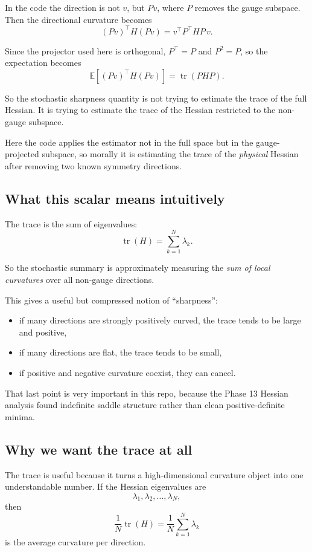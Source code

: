 \documentclass[11pt,letterpaper]{article}
\newcommand{\E}{\mathbb{E}}
\newcommand{\tr}{\operatorname{tr}}
\begin{document}
In the code the direction is not $v$, but $Pv$, where $P$ removes the gauge
subspace. Then the directional curvature becomes
\[
(Pv)^\top H (Pv) = v^\top P^\top H P\, v.
\]

Since the projector used here is orthogonal, $P^\top = P$ and $P^2 = P$, so
the expectation becomes
\[
\E[(Pv)^\top H (Pv)]
=
\tr(P H P).
\]

So the stochastic sharpness quantity is not trying to estimate the trace of the
full Hessian. It is trying to estimate the trace of the Hessian restricted to
the non-gauge subspace.

Here the code applies the estimator not in the full space but in the
gauge-projected subspace, so morally it is estimating the trace of the
\emph{physical} Hessian after removing two known symmetry directions.

\subsection{What this scalar means intuitively}

The trace is the sum of eigenvalues:
\[
\tr(H) = \sum_{k=1}^N \lambda_k.
\]

So the stochastic summary is approximately measuring the \emph{sum of local
curvatures} over all non-gauge directions.

This gives a useful but compressed notion of ``sharpness'':
\begin{itemize}[leftmargin=*]
  \item if many directions are strongly positively curved, the trace tends to
  be large and positive,
  \item if many directions are flat, the trace tends to be small,
  \item if positive and negative curvature coexist, they can cancel.
\end{itemize}

That last point is very important in this repo, because the Phase 13 Hessian
analysis found indefinite saddle structure rather than clean positive-definite
minima.

\subsection{Why we want the trace at all}

The trace is useful because it turns a high-dimensional curvature object into
one understandable number. If the Hessian eigenvalues are
\[
\lambda_1,\lambda_2,\ldots,\lambda_N,
\]
then
\[
\frac{1}{N}\tr(H)
=
\frac{1}{N}\sum_{k=1}^N \lambda_k
\]
is the average curvature per direction.
\end{document}

